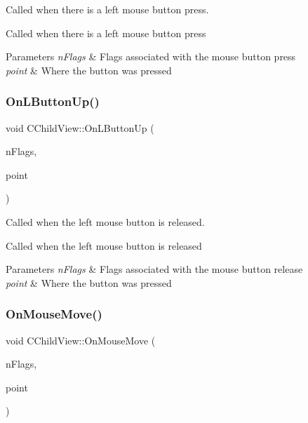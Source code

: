 Called when there is a left mouse button press. 

Called when there is a left mouse button press 
\begin{DoxyParams}{Parameters}
{\em n\+Flags} & Flags associated with the mouse button press \\
\hline
{\em point} & Where the button was pressed \\
\hline
\end{DoxyParams}
\mbox{\label{class_c_child_view_ae81948a77ebf3744bd0f9449af57ee21}} 
\subsubsection{\texorpdfstring{On\+L\+Button\+Up()}{OnLButtonUp()}}
{\footnotesize\ttfamily void C\+Child\+View\+::\+On\+L\+Button\+Up (\begin{DoxyParamCaption}\item[{U\+I\+NT}]{n\+Flags,  }\item[{C\+Point}]{point }\end{DoxyParamCaption})}



Called when the left mouse button is released. 

Called when the left mouse button is released 
\begin{DoxyParams}{Parameters}
{\em n\+Flags} & Flags associated with the mouse button release \\
\hline
{\em point} & Where the button was pressed \\
\hline
\end{DoxyParams}
\mbox{\label{class_c_child_view_ad3cb2f8d9fa9a6fb06989513dee5a8bc}} 
\subsubsection{\texorpdfstring{On\+Mouse\+Move()}{OnMouseMove()}}
{\footnotesize\ttfamily void C\+Child\+View\+::\+On\+Mouse\+Move (\begin{DoxyParamCaption}\item[{U\+I\+NT}]{n\+Flags,  }\item[{C\+Point}]{point }\end{DoxyParamCaption})}



